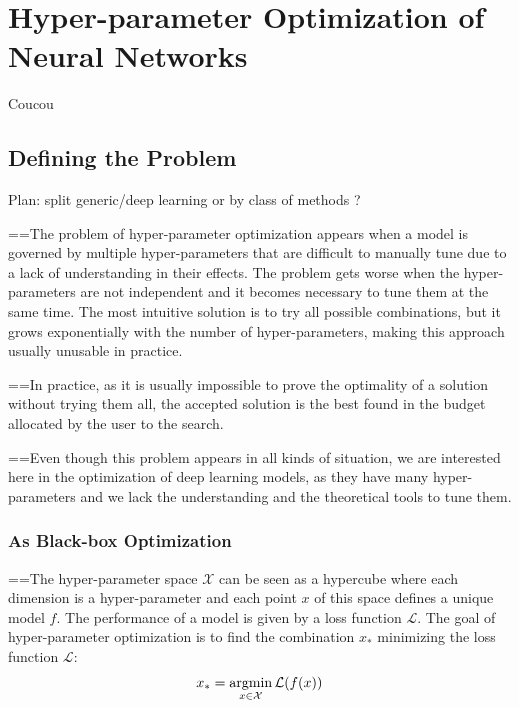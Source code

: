 \chapter{Hyper-parameter Optimization of Neural Networks}
\label{chap:hyperopt}

\begin{chapabstract}
 Coucou
\end{chapabstract}

\minitoc

\newpage

\section{Defining the Problem}

Plan: split generic/deep learning or by class of methods ?

==The problem of hyper-parameter optimization appears when a model is governed by multiple hyper-parameters that are difficult to manually tune due to a lack of understanding in their effects. The problem gets worse when the hyper-parameters are not independent and it becomes necessary to tune them at the same time. The most intuitive solution is to try all possible combinations, but it grows exponentially with the number of hyper-parameters, making this approach usually unusable in practice.

==In practice, as it is usually impossible to prove the optimality of a solution without trying them all, the accepted solution is the best found in the budget allocated by the user to the search.

==Even though this problem appears in all kinds of situation, we are interested here in the optimization of deep learning models, as they have many hyper-parameters and we lack the understanding and the theoretical tools to tune them.

\subsection{As Black-box Optimization}

==The hyper-parameter space $\mathcal{X}$ can be seen as a hypercube where each dimension is a hyper-parameter and each point $x$ of this space defines a unique model $f$. The performance of a model is given by a loss function $\mathcal{L}$. The goal of hyper-parameter optimization is to find the combination $x_*$ minimizing the loss function $\mathcal{L}$:
\begin{equation}
	x_* = \operatorname*{argmin}_{x \in \mathcal{X}} \mathcal{L}(f(x))
\end{equation}

